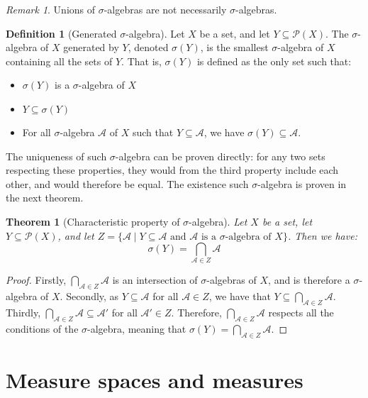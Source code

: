 \documentclass{article}
\newtheorem{theorem}{Theorem}[section]
\theoremstyle{definition}
\newtheorem{definition}{Definition}[section]
\theoremstyle{remark}
\newtheorem*{remark}{Remark}
\theoremstyle{example}
\begin{document}
\begin{remark}
    Unions of $\sigma$-algebras are not necessarily $\sigma$-algebras.
\end{remark}

\begin{definition}[Generated $\sigma$-algebra]
    Let $X$ be a set, and let $Y \subseteq \mathcal{P}(X)$. The $\sigma$-algebra of $X$ generated by $Y$, denoted $\sigma(Y)$, is the smallest $\sigma$-algebra of $X$ containing all the sets of $Y$. That is, $\sigma(Y)$ is defined as the only set such that:
    \begin{itemize}
        \item $\sigma(Y)$ is a $\sigma$-algebra of $X$
        \item $Y \subseteq \sigma(Y)$
        \item For all $\sigma$-algebra $\mathcal{A}$ of $X$ such that $Y \subseteq \mathcal{A}$, we have $\sigma(Y) \subseteq \mathcal{A}$.
    \end{itemize}
    The uniqueness of such $\sigma$-algebra can be proven directly: for any two sets respecting these properties, they would from the third property include each other, and would therefore be equal. The existence such $\sigma$-algebra is proven in the next theorem.
\end{definition}

\begin{theorem}[Characteristic property of $\sigma$-algebra]
    Let $X$ be a set, let $Y \subseteq \mathcal{P}(X)$, and let $Z = \{\mathcal{A} \mid \text{$Y \subseteq \mathcal{A}$ and $\mathcal{A}$ is a $\sigma$-algebra of $X$}\}$. Then we have:
        $$\sigma(Y) = \bigcap_{\mathcal{A} \in Z} \mathcal{A}$$
\end{theorem}

\begin{proof}
    Firstly, $\bigcap_{\mathcal{A} \in Z} \mathcal{A}$ is an intersection of $\sigma$-algebras of $X$, and is therefore a $\sigma$-algebra of $X$. Secondly, as $Y \subseteq \mathcal{A}$ for all $\mathcal{A} \in Z$, we have that $Y \subseteq \bigcap_{\mathcal{A} \in Z} \mathcal{A}$. Thirdly, $\bigcap_{\mathcal{A} \in Z} \mathcal{A} \subseteq \mathcal{A}'$ for all $\mathcal{A}' \in Z$. Therefore, $\bigcap_{\mathcal{A} \in Z} \mathcal{A}$ respects all the conditions of the $\sigma$-algebra, meaning that $\sigma(Y) = \bigcap_{\mathcal{A} \in Z} \mathcal{A}$.
\end{proof}


\section{Measure spaces and measures}
\end{document}
